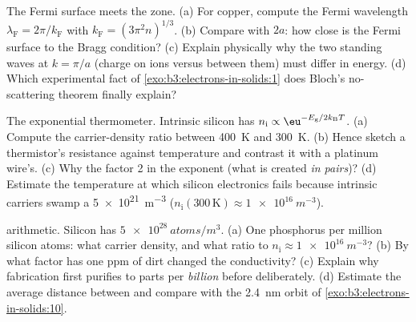 \begin{exercise}[$\star\star$]\label{exo:b3:electrons-in-solids:7}
The Fermi surface meets the zone. (a) For copper, compute the
Fermi wavelength $\lambda_{\text{F}} = 2\pi/k_{\text{F}}$ with
$k_{\text{F}} = (3\pi^2n)^{1/3}$. (b) Compare with $2a$: how
close is the Fermi surface to the Bragg condition? (c) Explain
physically why the two standing waves at $k = \pi/a$ (charge on
ions versus between them) must differ in energy. (d) Which
experimental fact of \cref{exo:b3:electrons-in-solids:1} does
Bloch's no-scattering theorem finally explain?
\end{exercise}

\begin{exercise}[$\star\star$]\label{exo:b3:electrons-in-solids:8}
The exponential thermometer. Intrinsic silicon has $n_{\text{i}}
\propto \eu^{-E_{\text{g}}/2k_{\text{B}}T}$. (a) Compute the
carrier-density ratio between \qty{400}{K} and \qty{300}{K}. (b)
Hence sketch a thermistor's resistance against temperature and
contrast it with a platinum wire's. (c) Why the factor 2 in the
exponent (what is created \emph{in pairs})? (d) Estimate the
temperature at which silicon electronics fails because intrinsic
carriers swamp a \qty{5e21}{m^{-3}} 
($n_{\text{i}}(300\,\text{K}) \approx \qty{1e16}{m^{-3}}$).
\end{exercise}

\begin{exercise}[$\star\star$]\label{exo:b3:electrons-in-solids:9}
 arithmetic. Silicon has $\qty{5e28}{atoms/m^3}$. (a) One
phosphorus per million silicon atoms: what carrier density, and
what ratio to $n_{\text{i}} \approx \qty{1e16}{m^{-3}}$? (b) By
what factor has one ppm of dirt changed the conductivity? (c)
Explain why  fabrication first purifies to parts
per \emph{billion} before  deliberately. (d) Estimate the
average distance between  and compare with the
\qty{2.4}{nm} orbit of \cref{exo:b3:electrons-in-solids:10}.
\end{exercise}

